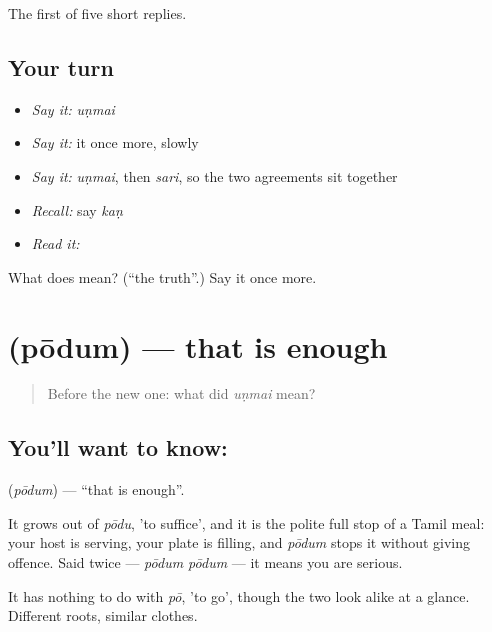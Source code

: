 \begin{grammarlens}[title={What you've built}]
The first of five short replies.
\end{grammarlens}

\subsection*{Your turn}
\begin{itemize}
\raggedright
  \item \emph{Say it:} \emph{uṇmai}
  \item \emph{Say it:} it once more, slowly
  \item \emph{Say it:} \emph{uṇmai}, then \emph{sari}, so the two agreements sit together
  \item \emph{Recall:} say \emph{kaṇ}
  \item \emph{Read it:} \textbf{}
\end{itemize}

\begin{tcolorbox}[breakable,colback=teal!4,colframe=teal!35!black,title={Before you move on}]
What does  mean? (\textquotedblleft{}the truth\textquotedblright{}.) Say it once more.
\end{tcolorbox}
\section[\texorpdfstring{\ta{போதும்} (pōdum)}{போதும் (pōdum)}]{ (pōdum) — that is enough}

\label{lesson:TA-C47-enough}



\begin{quote}
Before the new one: what did \emph{uṇmai} mean?
\end{quote}

\subsection*{You'll want to know: }
\textbf{} (\emph{pōdum}) — \textquotedblleft{}that is enough\textquotedblright{}.

It grows out of \emph{pōdu}, 'to suffice', and it is the polite full stop of a Tamil meal: your host is serving, your plate is filling, and \emph{pōdum} stops it without giving offence. Said twice — \emph{pōdum pōdum} — it means you are serious.

It has nothing to do with \emph{pō}, 'to go', though the two look alike at a glance. Different roots, similar clothes.

